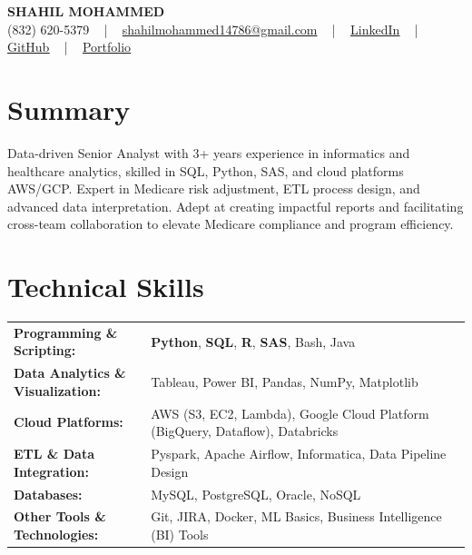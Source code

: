 \documentclass[letterpaper,11pt]{article}
\begin{document}
\begin{center}
    {\fontsize{14pt}{12pt}\selectfont \textbf{\MakeUppercase{Shahil Mohammed}}}\\ \vspace{2pt}
    \fontsize{10pt}{12pt}\selectfont (832) 620-5379 ~ | ~ \href{mailto:shahilmohammed14786@gmail.com}{shahilmohammed14786@gmail.com} ~ | ~  
    \href{https://www.linkedin.com/in/shahil-mohammed-9652931a1/}{\color{blue}\underline{LinkedIn}}  ~ | ~ 
    \href{https://github.com/freakbeast14}{\color{blue}\underline{GitHub}} ~ | ~ 
    \href{https://shahil-mohammed.netlify.app/}{\color{blue}\underline{Portfolio}}
    \vspace{-8pt}
\end{center}

\section{Summary}
\fontsize{9pt}{10pt}\selectfont
Data-driven Senior Analyst with 3+ years experience in informatics and healthcare analytics, skilled in SQL, Python, SAS, and cloud platforms AWS/GCP. Expert in Medicare risk adjustment, ETL process design, and advanced data interpretation. Adept at creating impactful reports and facilitating cross-team collaboration to elevate Medicare compliance and program efficiency.
 \vspace{-5pt}
 
\section{Technical Skills}
        \vspace{-14pt}
        \begin{table}[h]
            \fontsize{9pt}{10pt}\selectfont
            \begin{tabular}{p{0.3\linewidth} p{0.7\linewidth}}
                \textbf{Programming \& Scripting:} & \textbf{Python}, \textbf{SQL}, \textbf{R}, \textbf{SAS}, Bash, Java \\
                \textbf{Data Analytics \& Visualization:} & Tableau, Power BI, Pandas, NumPy, Matplotlib \\
                \textbf{Cloud Platforms:} & AWS (S3, EC2, Lambda), Google Cloud Platform (BigQuery, Dataflow), Databricks \\
                \textbf{ETL \& Data Integration:} & Pyspark, Apache Airflow, Informatica, Data Pipeline Design \\
                \textbf{Databases:} & MySQL, PostgreSQL, Oracle, NoSQL \\
                \textbf{Other Tools \& Technologies:} & Git, JIRA, Docker, ML Basics, Business Intelligence (BI) Tools \\
            \end{tabular}
        \end{table}
 \vspace{-15pt}
 
\end{document}
